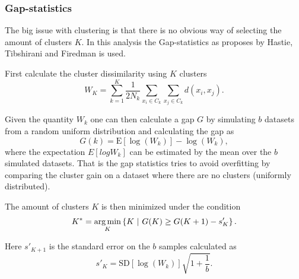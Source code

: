 \subsubsection{Gap-statistics}

The big issue with clustering is that there is no obvious way of selecting the amount of clusters $K$. In this analysis the Gap-statistics \cite[p.~519]{statistical-learning} as proposes by Hastie, Tibshirani and Firedman is used.

First calculate the cluster dissimilarity using $K$ clusters \cite{gap-statistic}
\begin{equation}
W_K = \sum_{k=1}^K \frac{1}{2 N_k} \sum_{x_i\in C_k} \sum_{x_j\in C_k} d(x_i,x_j).
\end{equation}

Given the quantity $W_k$ one can then calculate a gap $G$ by simulating $b$ datasets from a random uniform distribution and calculating the gap as
\begin{equation}
G(k) = \mathrm{E}[\log(W_k)] - \log(W_k),
\end{equation}
where the expectation $E[log W_k]$ can be estimated by the mean over the $b$ simulated datasets. That is the gap statistics tries to avoid overfitting by comparing the cluster gain on a dataset where there are no clusters (uniformly distributed).

The amount of clusters $K$ is then minimized under the condition
\begin{equation}
K^{*} = \operatorname*{arg\,min}_K \left\{ K \ | \ G(K) \ge G(K + 1) - s'_{K} \right\}.
\end{equation}

Here $s'_{K+1}$ is the standard error on the $b$ samples calculated as 
\begin{equation}
s'_{K} = \mathrm{SD}[\log(W_k)] \sqrt{1+\frac{1}{b}}.
\end{equation}
